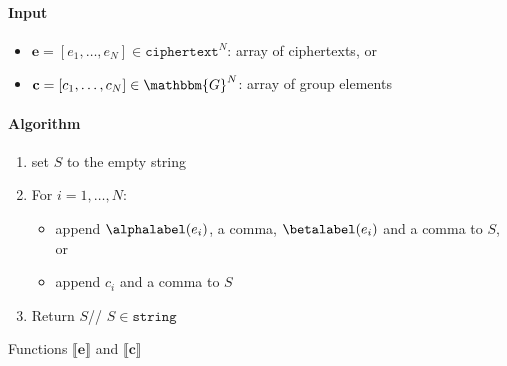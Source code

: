\documentclass[a4paper]{article}
\newcommand{\G}{\mathbbm{G}}
\newcommand{\jstring}{\texttt{string}}
\begin{document}
\begin{table}
  \begin{framed}
    \noindent\paragraph{Input}
    \begin{itemize}
    \item $\textbf{e}=[e_1,\dots,e_N]\in\texttt{ciphertext}^N$: array
      of ciphertexts, or
    \item $\textbf{c}=[c_1,\dots,c_N]\in\G^N$: array of group elements
    \end{itemize}
    \noindent\paragraph{Algorithm}
    \begin{enumerate}
    \item set $S$ to the empty string
    \item For $i=1,\dots,N$:
      \begin{itemize}
      \item append $\alphalabel(e_i)$, a comma, $\betalabel(e_i)$ and a comma to $S$, or\hfill
      \item append $c_i$ and a comma to $S$\hfill
      \end{itemize}
    \item Return $S$\hfill// $S\in\jstring$
    \end{enumerate}
  \end{framed}
  \caption{Functions $\llbracket\textbf{e}\rrbracket$ and $\llbracket\textbf{c}\rrbracket$}
  \label{serialize-array}
\end{table}
\end{document}
